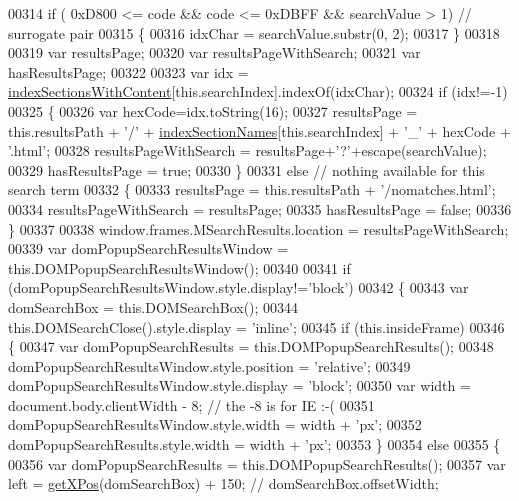 \begin{DoxyCode}
00314     \textcolor{keywordflow}{if} ( 0xD800 <= code && code <= 0xDBFF && searchValue > 1) \textcolor{comment}{// surrogate pair}
00315     \{
00316       idxChar = searchValue.substr(0, 2);
00317     \}
00318 
00319     var resultsPage;
00320     var resultsPageWithSearch;
00321     var hasResultsPage;
00322 
00323     var idx = \hyperlink{searchdata_8js_a6250af3c9b54dee6efc5f55f40c78126}{indexSectionsWithContent}[this.searchIndex].indexOf(idxChar);
00324     \textcolor{keywordflow}{if} (idx!=-1)
00325     \{
00326        var hexCode=idx.toString(16);
00327        resultsPage = this.resultsPath + \textcolor{charliteral}{'/'} + \hyperlink{searchdata_8js_a77149ceed055c6c6ce40973b5bdc19ad}{indexSectionNames}[this.searchIndex] + \textcolor{charliteral}{'\_'} + 
      hexCode + \textcolor{stringliteral}{'.html'};
00328        resultsPageWithSearch = resultsPage+\textcolor{charliteral}{'?'}+escape(searchValue);
00329        hasResultsPage = \textcolor{keyword}{true};
00330     \}
00331     \textcolor{keywordflow}{else} \textcolor{comment}{// nothing available for this search term}
00332     \{
00333        resultsPage = this.resultsPath + \textcolor{stringliteral}{'/nomatches.html'};
00334        resultsPageWithSearch = resultsPage;
00335        hasResultsPage = \textcolor{keyword}{false};
00336     \}
00337 
00338     window.frames.MSearchResults.location = resultsPageWithSearch;
00339     var domPopupSearchResultsWindow = this.DOMPopupSearchResultsWindow();
00340 
00341     \textcolor{keywordflow}{if} (domPopupSearchResultsWindow.style.display!=\textcolor{stringliteral}{'block'})
00342     \{
00343        var domSearchBox = this.DOMSearchBox();
00344        this.DOMSearchClose().style.display = \textcolor{stringliteral}{'inline'};
00345        \textcolor{keywordflow}{if} (this.insideFrame)
00346        \{
00347          var domPopupSearchResults = this.DOMPopupSearchResults();
00348          domPopupSearchResultsWindow.style.position = \textcolor{stringliteral}{'relative'};
00349          domPopupSearchResultsWindow.style.display  = \textcolor{stringliteral}{'block'};
00350          var width = document.body.clientWidth - 8; \textcolor{comment}{// the -8 is for IE :-(}
00351          domPopupSearchResultsWindow.style.width    = width + \textcolor{stringliteral}{'px'};
00352          domPopupSearchResults.style.width          = width + \textcolor{stringliteral}{'px'};
00353        \}
00354        \textcolor{keywordflow}{else}
00355        \{
00356          var domPopupSearchResults = this.DOMPopupSearchResults();
00357          var left = \hyperlink{search_8js_a76d24aea0009f892f8ccc31d941c0a2b}{getXPos}(domSearchBox) + 150; \textcolor{comment}{// domSearchBox.offsetWidth;}

\end{DoxyCode}
